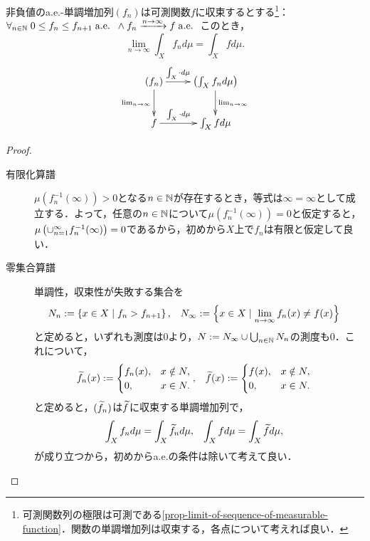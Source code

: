 \documentclass[uplatex, dvipdfmx]{jsreport}
\begin{document}
\begin{theorem}\label{thm-monotone-convergence-theorem}
    非負値のa.e.-単調増加列$(f_n)$は可測関数$f$に収束するとする\footnote{可測関数列の極限は可測である\ref{prop-limit-of-sequence-of-measurable-function}．関数の単調増加列は収束する，各点について考えれば良い．}：$\forall_{n\in\mathbb{N}}\;0\le f_n\le f_{n+1}\;\mathrm{a.e.}\;\;\land f_n\xrightarrow{n\to\infty}f\;\mathrm{a.e.}\;$
    このとき，\[\lim_{n\to\infty}\int_Xf_nd\mu=\int_Xfd\mu.\]
    \[\xymatrix{
        (f_n)\ar[r]^-{\int_X\cdot d\mu}\ar[d]_-{\lim_{n\to\infty}}&\paren{\int_Xf_nd\mu}\ar[d]^-{\lim_{n\to\infty}}\\
        f\ar[r]^-{\int_X\cdot d\mu}&\int_Xfd\mu
    }\]
\end{theorem}
\begin{proof}\mbox{}
    \begin{description}
        \item[有限化算譜] $\mu(f_n^{-1}(\infty))>0$となる$n\in\mathbb{N}$が存在するとき，等式は$\infty=\infty$として成立する．よって，任意の$n\in\mathbb{N}$について$\mu(f_n^{-1}(\infty))=0$と仮定すると，$\mu\left(\cup_{n=1}^\infty f_n^{-1}(\infty)\right)=0$であるから，初めから$X$上で$f_n$は有限と仮定して良い．
        \item[零集合算譜] 単調性，収束性が失敗する集合を
        \begin{align*}
            N_n&:=\left\{x\in X\mid f_n>f_{n+1}\right\},&N_\infty&:=\left\{x\in X\mid\lim_{n\to\infty}f_n(x)\ne f(x)\right\}
        \end{align*}
        と定めると，いずれも測度は$0$より，$N:=N_\infty\cup\bigcup_{n\in\mathbb{N}}N_n$の測度も$0$．これについて，
        \begin{align*}
            \widetilde{f}_n(x)&:=\begin{cases}
                f_n(x),&x\notin N,\\
                0,&x\in N.
            \end{cases},&\widetilde{f}(x)&:=\begin{cases}
                f(x),&x\notin N,\\
                0,&x\in N.
            \end{cases}
        \end{align*}
        と定めると，$(\widetilde{f}_n)$は$\widetilde{f}$に収束する単調増加列で，
        \begin{align*}
            \int_Xf_nd\mu&=\int_X\widetilde{f}_nd\mu,&\int_Xfd\mu&=\int_X\widetilde{f}d\mu,
        \end{align*}
        が成り立つから，初めからa.e.の条件は除いて考えて良い．

\end{description}
\end{proof}
\end{document}
